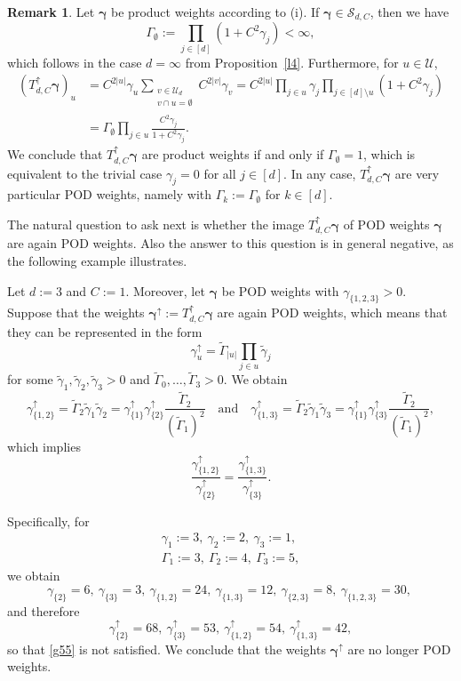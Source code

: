 \documentclass{article}
\newcommand{\bg}{{\boldsymbol{\gamma}}}
\newcommand{\U}  {\mathcal{U}}
\newcommand{\SSS}{\mathcal{S}}
\newcommand{\up}{\uparrow}
\theoremstyle{plain}
\theoremstyle{definition}
\newtheorem{rem}{Remark}
\begin{document}
\begin{rem}\label{r2}
Let $\bg$ be product weights according to (i). 
If $\bg \in \SSS_{d,C}$, then we have
\[
\Gamma_\emptyset := \prod_{j \in [d]} (1 + C^2 \gamma_j) < \infty,
\] 
which follows in the case $d=\infty$ from Proposition~\ref{l4}. 
Furthermore, for $u \in \U$,
\begin{align*}
\left(T^\up_{d,C} \bg\right)_u &= 
C^{2|u|} \gamma_u 
\sum_{\substack{v \in \U_d \\ v \cap u = \emptyset}} C^{2|v|} \gamma_v 
= 
C^{2|u|} \prod_{j \in u} \gamma_j 
\prod_{j \in [d] \setminus u} (1 + C^2 \gamma_j) \\
&=
\Gamma_\emptyset 
\prod_{j \in u} \frac{C^2 \gamma_j}{1+C^2\gamma_j}.
\end{align*}
We conclude that $T^\up_{d,C} \bg$ are product weights if
and only if $\Gamma_\emptyset = 1$, which is equivalent to
the trivial case $\gamma_j = 0$ for all $j\in[d]$. In any case, 
$T^\up_{d,C} \bg$ are very particular POD weights, namely
with $\Gamma_k := \Gamma_\emptyset$ for $k \in [d]$.

The natural question to ask next is whether the image 
$T^\up_{d,C} \bg$ of POD weights $\bg$ are again POD weights. Also 
the answer to this question is in general negative, as the 
following example illustrates. 

Let $d := 3$ and $C := 1$. Moreover, let $\bg$ be POD weights
with $\gamma_{\{1,2,3\}} > 0$. Suppose that the weights 
$\bg^\up := T^\up_{d,C} \bg$ are again POD weights, which 
means that they can be represented in the form 
\[
 \gamma^\up_u =
 \widetilde{\Gamma}_{|u|} \prod_{j\in u} \widetilde{\gamma}_j
\]
for some
$\widetilde{\gamma}_1,\widetilde{\gamma}_2,\widetilde{\gamma}_3 > 0$ 
and
$\widetilde{\Gamma}_0,\dots,\widetilde{\Gamma}_3 > 0$. We obtain
\[
\gamma_{\{1,2\}}^\up =
 \widetilde{\Gamma}_2 \widetilde{\gamma}_1 \widetilde{\gamma}_2 = 
\gamma_{\{1\}}^\up \gamma_{\{2\}}^\up
\frac{\widetilde{\Gamma}_2}{(\widetilde{\Gamma}_1)^2} 
\quad\text{and}\quad
\gamma_{\{1,3\}}^\up =
 \widetilde{\Gamma}_2 \widetilde{\gamma}_1 \widetilde{\gamma}_3 = 
\gamma_{\{1\}}^\up \gamma_{\{3\}}^\up
\frac{\widetilde{\Gamma}_2}{(\widetilde{\Gamma}_1)^2}, 
\]
which implies 
\begin{equation}\label{g55}
\frac{\gamma_{\{1,2\}}^\up}{\gamma_{\{2\}}^\up} 
= 
\frac{\gamma_{\{1,3\}}^\up}{\gamma_{\{3\}}^\up}.
\end{equation}

Specifically, for 
\begin{gather*}
 \gamma_1:=3,\ \gamma_2:=2,\ \gamma_3:=1,\\
 \Gamma_1:=3,\ \Gamma_2:=4,\ \Gamma_3:=5,
\end{gather*}
we obtain 
\[
\gamma_{\{2\}} = 6,\ 
\gamma_{\{3\}} = 3,\ 
\gamma_{\{1,2\}} = 24,\ 
\gamma_{\{1,3\}} = 12,\ 
\gamma_{\{2,3\}} = 8,\ 
\gamma_{\{1,2,3\}} = 30,\ 
\]
and therefore
\[
\gamma_{\{2\}}^\up = 68,\ \gamma_{\{3\}}^\up = 53,\
\gamma_{\{1,2\}}^\up = 54,\ \gamma_{\{1,3\}}^\up = 42,
\]
so that \eqref{g55} is not satisfied. We conclude that the weights
$\bg^\up$ are no longer POD weights.


\end{rem}
\end{document}
